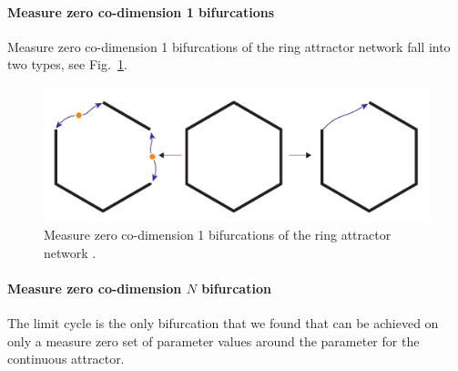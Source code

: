 \documentclass{article} %
\newcounter{ct}
\theoremstyle{definition}
\theoremstyle{remark}
\begin{document}
\newpage
\paragraph{Measure zero co-dimension 1 bifurcations}
Measure zero co-dimension 1 bifurcations of the ring attractor network fall into two types, see Fig.~\ref{fig:meaure_zero_perturbations}.

\begin{figure}[tbhp]
     \centering
    \includegraphics[width=.9\textwidth]{ring_n6_perturbations_schematic}
       \caption{Measure zero co-dimension 1 bifurcations of the ring attractor network \citep{Noorman2022}.}\label{fig:meaure_zero_perturbations}
\end{figure}


\paragraph{Measure zero co-dimension \(N\) bifurcation}
The limit cycle is the only bifurcation that we found that can be achieved on only a measure zero set of parameter values around the parameter for the continuous attractor.
\end{document}

